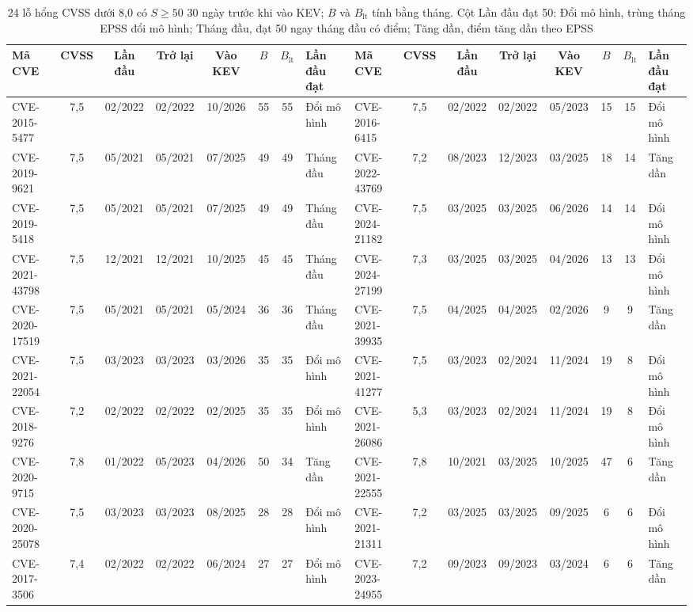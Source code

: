 \documentclass[conference]{IEEEtran}
\begin{document}
\begin{table}[t]
\caption{24 lỗ hổng CVSS dưới 8,0 có $S \ge 50$ 30 ngày trước khi vào KEV; $B$ và $B_{\text{lt}}$
tính bằng tháng. Cột Lần đầu đạt 50: Đổi mô hình, trùng tháng EPSS đổi mô hình; Tháng đầu, đạt 50 ngay tháng đầu có điểm; Tăng dần, điểm tăng dần theo EPSS}\label{tab:baotruoc}
\centering
\footnotesize
\setlength{\tabcolsep}{2pt}
\begin{tabular}{lccccccl@{\hspace{1em}}lccccccl}
\toprule
Mã CVE & CVSS & Lần đầu & Trở lại & Vào KEV & $B$ & $B_{\text{lt}}$ & Lần đầu đạt &
Mã CVE & CVSS & Lần đầu & Trở lại & Vào KEV & $B$ & $B_{\text{lt}}$ & Lần đầu đạt \\
\midrule
CVE-2015-5477 & 7,5 & 02/2022 & 02/2022 & 10/2026 & 55 & 55 & Đổi mô hình &
CVE-2016-6415 & 7,5 & 02/2022 & 02/2022 & 05/2023 & 15 & 15 & Đổi mô hình \\
CVE-2019-9621 & 7,5 & 05/2021 & 05/2021 & 07/2025 & 49 & 49 & Tháng đầu &
CVE-2022-43769 & 7,2 & 08/2023 & 12/2023 & 03/2025 & 18 & 14 & Tăng dần \\
CVE-2019-5418 & 7,5 & 05/2021 & 05/2021 & 07/2025 & 49 & 49 & Tháng đầu &
CVE-2024-21182 & 7,5 & 03/2025 & 03/2025 & 06/2026 & 14 & 14 & Đổi mô hình \\
CVE-2021-43798 & 7,5 & 12/2021 & 12/2021 & 10/2025 & 45 & 45 & Tháng đầu &
CVE-2024-27199 & 7,3 & 03/2025 & 03/2025 & 04/2026 & 13 & 13 & Đổi mô hình \\
CVE-2020-17519 & 7,5 & 05/2021 & 05/2021 & 05/2024 & 36 & 36 & Tháng đầu &
CVE-2021-39935 & 7,5 & 04/2025 & 04/2025 & 02/2026 & 9 & 9 & Tăng dần \\
CVE-2021-22054 & 7,5 & 03/2023 & 03/2023 & 03/2026 & 35 & 35 & Đổi mô hình &
CVE-2021-41277 & 7,5 & 03/2023 & 02/2024 & 11/2024 & 19 & 8 & Đổi mô hình \\
CVE-2018-9276 & 7,2 & 02/2022 & 02/2022 & 02/2025 & 35 & 35 & Đổi mô hình &
CVE-2021-26086 & 5,3 & 03/2023 & 02/2024 & 11/2024 & 19 & 8 & Đổi mô hình \\
CVE-2020-9715 & 7,8 & 01/2022 & 05/2023 & 04/2026 & 50 & 34 & Tăng dần &
CVE-2021-22555 & 7,8 & 10/2021 & 03/2025 & 10/2025 & 47 & 6 & Tăng dần \\
CVE-2020-25078 & 7,5 & 03/2023 & 03/2023 & 08/2025 & 28 & 28 & Đổi mô hình &
CVE-2021-21311 & 7,2 & 03/2025 & 03/2025 & 09/2025 & 6 & 6 & Đổi mô hình \\
CVE-2017-3506 & 7,4 & 02/2022 & 02/2022 & 06/2024 & 27 & 27 & Đổi mô hình &
CVE-2023-24955 & 7,2 & 09/2023 & 09/2023 & 03/2024 & 6 & 6 & Tăng dần \\

\end{tabular}
\end{table}
\end{document}
